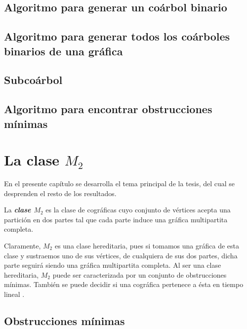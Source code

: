     \subsection{Algoritmo para generar un coárbol binario}
        
    \subsection{Algoritmo para generar todos los coárboles binarios de una gráfica}
        
    \subsection{Subcoárbol}
        
    \subsection{Algoritmo para encontrar obstrucciones mínimas} \label{sec_AlgoSub}
        


\section{La clase $M_2$}

    En el presente capítulo se desarrolla el tema principal de la tesis, del cual se desprenden el resto de los resultados.

    \begin{definition}
        La \textbf{\emph{clase $M_2$}} es la clase de cográficas cuyo conjunto de vértices acepta una partición en dos partes tal que cada parte induce una gráfica multipartita completa. %
    \end{definition}

    Claramente, $M_2$ es una clase hereditaria, pues si tomamos una gráfica de esta clase y sustraemos uno de sus vértices, de cualquiera de sus dos partes, dicha parte seguirá siendo una gráfica multipartita completa. Al ser una clase hereditaria, $M_2$ puede ser caracterizada por un conjunto de obstrucciones mínimas. También se puede decidir si una cográfica pertenece a ésta en tiempo lineal \cite{unknown}.

    \subsection{Obstrucciones mínimas}
        

